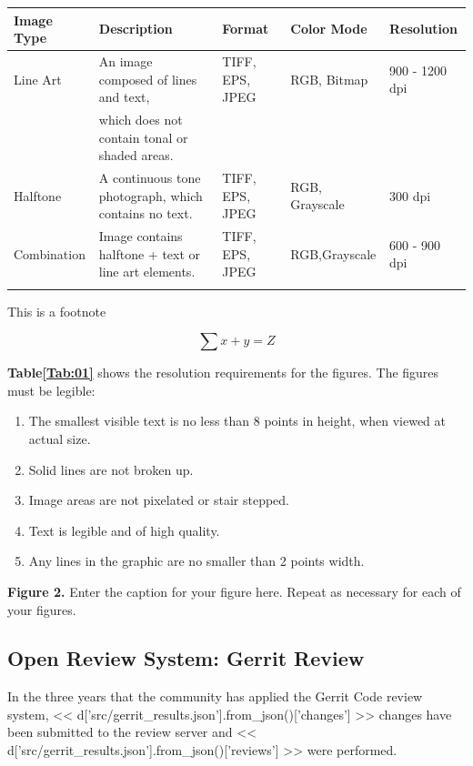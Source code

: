 \documentclass{frontiersENG} %
\begin{document}
\begin{table}[!t]
{\begin{tabular}{lllll}\toprule
Image Type & Description & Format & Color Mode & Resolution\\\midrule
Line Art & An image composed of lines and text,  & TIFF, EPS, JPEG & RGB, Bitmap & 900 - 1200 dpi\\
           & which does not contain tonal or shaded areas.& & &\\
           Halftone & A continuous tone photograph, which contains no text. & TIFF, EPS, JPEG & RGB, Grayscale & 300 dpi\\
Combination & Image contains halftone + text or line art elements. & TIFF, EPS, JPEG & RGB,Grayscale & 600 - 900 dpi\\\botrule
\end{tabular}}{This is a footnote}
\end{table}

\begin{equation}
\sum x+ y =Z\label{eq:01}
\end{equation}

\textbf{Table\ref{Tab:01}} shows the resolution requirements for the figures. The figures must be legible:
\begin{enumerate}
\item The smallest visible text is no less than 8 points in height, when viewed at actual size.
\item Solid lines are not broken up.
\item Image areas are not pixelated or stair stepped.
\item Text is legible and of high quality.
\item Any lines in the graphic are no smaller than 2 points width.
\end{enumerate}

\textbf{Figure 2.}{ Enter the caption for your figure here.  Repeat as  necessary for each of your figures.}\label{fig:02}

\subsection{Open Review System: Gerrit Review}

In the three years that the community has applied the Gerrit Code review
system, << d['src/gerrit_results.json'].from_json()['changes'] >> changes have
been submitted to the review server and
<< d['src/gerrit_results.json'].from_json()['reviews'] >> were performed.
 
\end{document}

